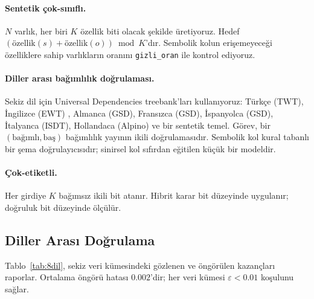 \documentclass[11pt,a4paper]{article}
\begin{document}
\paragraph{Sentetik çok-sınıflı.}
$N$ varlık, her biri $K$ özellik biti olacak şekilde üretiyoruz.
Hedef $(\text{özellik}(s) + \text{özellik}(o)) \bmod K$'dır.
Sembolik kolun erişemeyeceği özelliklere sahip varlıkların oranını
\texttt{gizli\_oran} ile kontrol ediyoruz.

\paragraph{Diller arası bağımlılık doğrulaması.}
Sekiz dil için Universal Dependencies \cite{nivre2020ud} treebank'ları
kullanıyoruz: Türkçe (TWT), İngilizce (EWT) \cite{silveira2014gold},
Almanca (GSD), Fransızca (GSD), İspanyolca (GSD), İtalyanca (ISDT),
Hollandaca (Alpino) ve bir sentetik temel. Görev, bir
$(\text{bağımlı}, \text{baş})$ bağımlılık yayının ikili
doğrulamasıdır. Sembolik kol kural tabanlı bir şema doğrulayıcısıdır;
sinirsel kol sıfırdan eğitilen küçük bir modeldir.

\paragraph{Çok-etiketli.}
Her girdiye $K$ bağımsız ikili bit atanır. Hibrit karar bit düzeyinde
uygulanır; doğruluk bit düzeyinde ölçülür.

\subsection{Diller Arası Doğrulama}
\label{sec:diller_arasi}
Tablo~\ref{tab:8dil}, sekiz veri kümesindeki gözlenen ve öngörülen
kazançları raporlar. Ortalama öngörü hatası $0.002$'dir; her veri
kümesi $\varepsilon < 0.01$ koşulunu sağlar.
\end{document}

